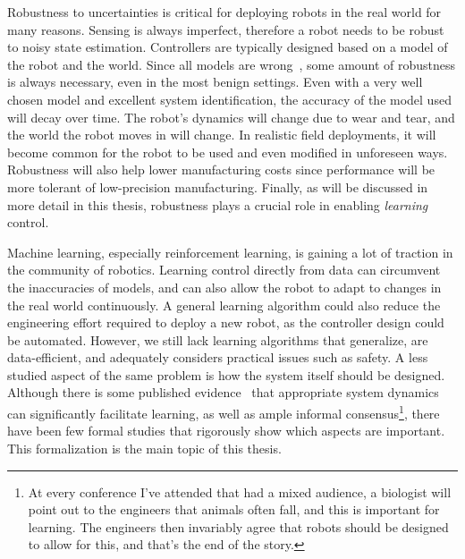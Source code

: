 Robustness to uncertainties is critical for deploying robots in the real world for many reasons.
Sensing is always imperfect, therefore a robot needs to be robust to noisy state estimation.
Controllers are typically designed based on a model of the robot and the world. Since all models are wrong~\cite{box1976science}, some amount of robustness is always necessary, even in the most benign settings.
Even with a very well chosen model and excellent system identification, the accuracy of the model used will decay over time.
The robot's dynamics will change due to wear and tear, and the world the robot moves in will change.
In realistic field deployments, it will become common for the robot to be used and even modified in unforeseen ways.
Robustness will also help lower manufacturing costs since performance will be more tolerant of low-precision manufacturing.
Finally, as will be discussed in more detail in this thesis, robustness plays a crucial role in enabling \emph{learning} control.
\par
Machine learning, especially reinforcement learning, is gaining a lot of traction in the community of robotics. Learning control directly from data can circumvent the inaccuracies of models, and can also allow the robot to adapt to changes in the real world continuously.
A general learning algorithm could also reduce the engineering effort required to deploy a new robot, as the controller design could be automated.
However, we still lack learning algorithms that generalize, are data-efficient, and adequately considers practical issues such as safety.
A less studied aspect of the same problem is how the system itself should be designed. Although there is some published evidence~\cite{tedrake2005learning, randlov2000shaping} that appropriate system dynamics can significantly facilitate learning, as well as ample informal consensus\footnote{At every conference I've attended that had a mixed audience, a biologist will point out to the engineers that animals often fall, and this is important for learning. The engineers then invariably agree that robots should be designed to allow for this, and that's the end of the story.}, there have been few formal studies that rigorously show which aspects are important. This formalization is the main topic of this thesis.


